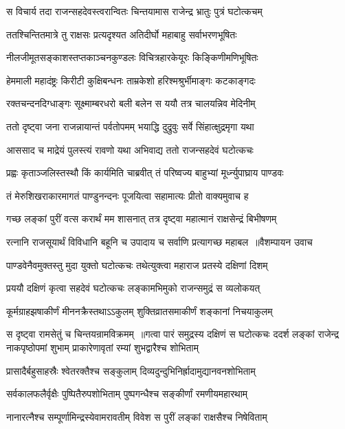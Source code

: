 \twolineshloka
{स विचार्य तदा राजन्सहदेवस्त्वरान्वितः}
{चिन्तयामास राजेन्द्र भ्रातुः पुत्रं घटोत्कचम्}


\twolineshloka
{ततश्चिन्तितमात्रे तु राक्षसः प्रत्यदृश्यत}
{अतिदीर्घो महाबाहु सर्वाभरणभूषितः}


\twolineshloka
{नीलजीमूतसङ्काशस्तप्तकाञ्चनकुण्डलः}
{विचित्रहारकेयूरः किङ्किणीमणिभूषितः}


\twolineshloka
{हेममाली महादंष्ट्रः किरीटी कुक्षिबन्धनः}
{ताम्रकेशो हरिश्मश्रुर्भीमाङ्गः कटकाङ्गदः}


\twolineshloka
{रक्तचन्दनदिग्धाङ्गः सूक्ष्माम्बरधरो बली}
{बलेन स ययौ तत्र चालयन्निव मेदिनीम्}


\twolineshloka
{ततो दृष्ट्वा जना राजन्नायान्तं पर्वतोपमम्}
{भयाद्धि दुद्रुवुः सर्वे सिंहात्क्षुद्रमृगा यथा}


\twolineshloka
{आससाद च माद्रेयं पुलस्त्यं रावणो यथा}
{अभिवाद्य ततो राजन्सहदेवं घटोत्कचः}


\twolineshloka
{प्रह्वः कृताञ्जलिस्तस्थौ किं कार्यमिति चाब्रवीत्}
{तं परिष्वज्य बाहुभ्यां मूर्ध्न्युपाघ्राय पाण्डवः}


\twolineshloka
{तं मेरुशिखराकारमागतं पाण्डुनन्दनः}
{पूजयित्वा सहामात्यः प्रीतो वाक्यमुवाच ह}


\twolineshloka
{गच्छ लङ्कां पुरीं वत्स करार्थं मम शासनात्}
{तत्र दृष्ट्वा महात्मानं राक्षसेन्द्रं बिभीषणम्}


\threelineshloka
{रत्नानि राजसूयार्थं विविधानि बहूनि च}
{उपादाय च सर्वाणि प्रत्यागच्छ महाबल ॥वैशम्पायन उवाच}
{}


\twolineshloka
{पाण्डवेनैवमुक्तस्तु मुदा युक्तो घटोत्कचः}
{तथेत्युक्त्वा महाराज प्रतस्ये दक्षिणां दिशम्}


\twolineshloka
{प्रययौ दक्षिणं कृत्वा सहदेवं घटोत्कचः}
{लङ्कामभिमुको राजन्समुद्रं स व्यलोकयत्}


\twolineshloka
{कूर्मग्राहझषाकीर्णं मीननक्रैस्तथाऽऽकुलम्}
{शुक्तिव्रातसमाकीर्णं शङ्कानां निचयाकुलम्}


स दृष्ट्वा रामसेतुं च चिन्तयन्रामविक्रमम् ॥गत्वा पारं समुद्रस्य दक्षिणं स घटोत्कचः
\twolineshloka
{ददर्श लङ्कां राजेन्द्र नाकपृष्ठोपमां शुभाम्}
{प्राकारेणावृतां रम्यां शुभद्वारैश्च शोभिताम्}


\twolineshloka
{प्रासादैर्बहुसाहस्रैः श्वेतरक्तैश्च सङ्कुलाम्}
{दिव्यदुन्दुभिनिर्ह्रादामुद्यानवनशोभिताम्}


\twolineshloka
{सर्वकालफलैर्वृक्षैः पुष्पितैरुपशोभिताम्}
{पुष्पगन्धैश्च सङ्कीर्णां रमणीयमहारथाम्}


\twolineshloka
{नानारत्नैश्च सम्पूर्णामिन्द्रस्येवामरावतीम्}
{विवेश स पुरीं लङ्कां राक्षसैश्च निषेविताम्}


